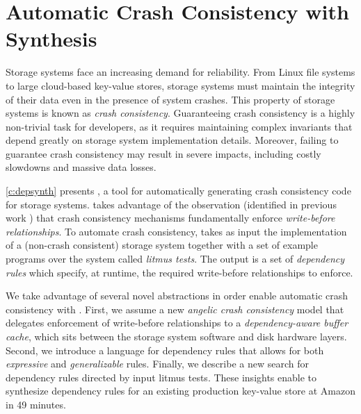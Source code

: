 \section{Automatic Crash Consistency with Synthesis}
Storage systems face an increasing demand for reliability.
From Linux file systems to large cloud-based key-value stores,
storage systems must maintain the integrity of their data
even in the presence of system crashes.
This property of storage systems is known as \textit{crash consistency}.
Guaranteeing crash consistency is a highly non-trivial task for developers,
as it requires maintaining complex invariants that depend greatly on
storage system implementation details.
Moreover, failing to guarantee crash consistency may result in severe impacts,
including costly slowdowns and massive data losses. %

\cref{c:depsynth} presents \depsynth, a tool for automatically generating crash consistency
code for storage systems.
\depsynth takes advantage of the observation
(identified in previous work )
that crash consistency mechanisms fundamentally enforce \textit{write-before relationships}.
To automate crash consistency,
\depsynth takes as input the implementation of a (non-crash consistent) storage system together
with a set of example programs over the system called \textit{litmus tests}.
The output is a set of \textit{dependency rules} which specify, at runtime,
the required write-before relationships to enforce.

We take advantage of several novel abstractions in order enable
automatic crash consistency with \depsynth.
First, we assume a new \textit{angelic crash consistency} model
that delegates enforcement of write-before relationships to a
\textit{dependency-aware buffer cache},
which sits between the storage system software and disk hardware layers.
Second, we introduce a language for dependency rules
that allows for both \textit{expressive} and \textit{generalizable} rules.
Finally, we describe a new search for dependency rules
directed by input litmus tests.
These insights enable \depsynth to synthesize dependency rules for an existing
production key-value store at Amazon in 49 minutes.

